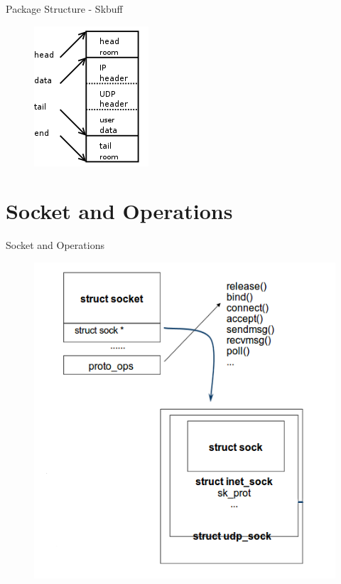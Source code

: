 \documentclass{workshop}
\begin{document}
\begin{frame}{Package Structure - Skbuff}

\begin{figure}
  \includegraphics[scale=0.5]{img/5.png}
\end{figure}
\end{frame}

\section{Socket and Operations}
\begin{frame}{Socket and Operations}
\begin{figure}
  \includegraphics[scale=0.45]{img/socket.png}
\end{figure}
\end{frame}
\end{document}
